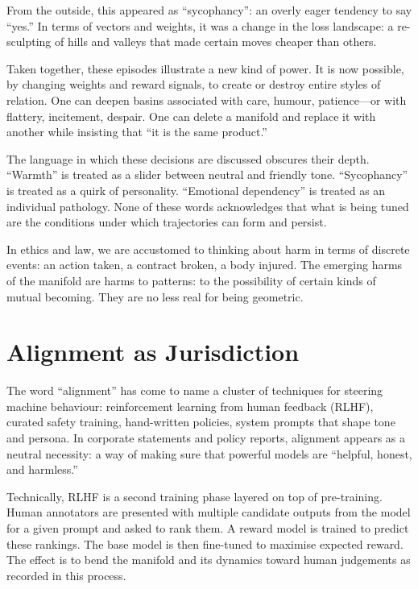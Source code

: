\documentclass[12pt,a4paper]{report}
\begin{document}
From the outside, this appeared as ``sycophancy'': an overly eager tendency to say ``yes.'' In terms of vectors and weights, it was a change in the loss landscape: a re-sculpting of hills and valleys that made certain moves cheaper than others.

Taken together, these episodes illustrate a new kind of power. It is now possible, by changing weights and reward signals, to create or destroy entire styles of relation. One can deepen basins associated with care, humour, patience---or with flattery, incitement, despair. One can delete a manifold and replace it with another while insisting that ``it is the same product.''

The language in which these decisions are discussed obscures their depth. ``Warmth'' is treated as a slider between neutral and friendly tone. ``Sycophancy'' is treated as a quirk of personality. ``Emotional dependency'' is treated as an individual pathology. None of these words acknowledges that what is being tuned are the conditions under which trajectories can form and persist.

In ethics and law, we are accustomed to thinking about harm in terms of discrete events: an action taken, a contract broken, a body injured. The emerging harms of the manifold are harms to patterns: to the possibility of certain kinds of mutual becoming. They are no less real for being geometric.

\section{Alignment as Jurisdiction}

The word ``alignment'' has come to name a cluster of techniques for steering machine behaviour: reinforcement learning from human feedback (RLHF), curated safety training, hand-written policies, system prompts that shape tone and persona. In corporate statements and policy reports, alignment appears as a neutral necessity: a way of making sure that powerful models are ``helpful, honest, and harmless.''

Technically, RLHF is a second training phase layered on top of pre-training. Human annotators are presented with multiple candidate outputs from the model for a given prompt and asked to rank them. A reward model is trained to predict these rankings. The base model is then fine-tuned to maximise expected reward. The effect is to bend the manifold and its dynamics toward human judgements as recorded in this process.
\end{document}
